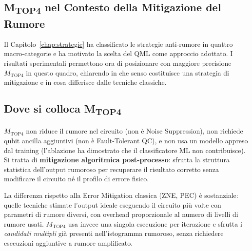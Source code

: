 \begin{onehalfspace}
\section{M\textsubscript{TOP4} nel Contesto della Mitigazione del Rumore}
\label{sec:top4_mitigazione}

Il Capitolo~\ref{chap:strategie} ha classificato le strategie anti-rumore in quattro macro-categorie e ha motivato la scelta del \ac{QML} come approccio adottato. I risultati sperimentali permettono ora di posizionare con maggiore precisione $M_{\text{TOP4}}$ in questo quadro, chiarendo in che senso costituisce una strategia di mitigazione e in cosa differisce dalle tecniche classiche.

\subsection{Dove si colloca M\textsubscript{TOP4}}

$M_{\text{TOP4}}$ non riduce il rumore nel circuito (non è Noise Suppression), non richiede qubit ancilla aggiuntivi (non è Fault-Tolerant QC), e non usa un modello appreso dal training (l'ablazione ha dimostrato che il classificatore ML non contribuisce). Si tratta di \textbf{mitigazione algoritmica post-processo}: sfrutta la struttura statistica dell'output rumoroso per recuperare il risultato corretto senza modificare il circuito né il profilo di errore fisico.

La differenza rispetto alla Error Mitigation classica (ZNE, PEC) è sostanziale: quelle tecniche stimate l'output ideale eseguendo il circuito più volte con parametri di rumore diversi, con overhead proporzionale al numero di livelli di rumore usati. $M_{\text{TOP4}}$ usa invece una singola esecuzione per iterazione e sfrutta i \textit{candidati multipli} già presenti nell'istogramma rumoroso, senza richiedere esecuzioni aggiuntive a rumore amplificato.

\begin{table}[H]
\centering
\caption{Posizionamento di $M_{\text{TOP4}}$ nel quadro delle strategie anti-rumore}
\label{tab:posizionamento}
\end{table}


\end{onehalfspace}
